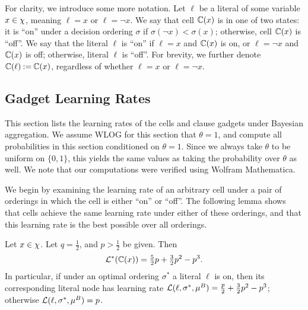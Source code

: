 For clarity, we introduce some more notation. Let $ \ell $ be a literal of some variable $ x \in \chi $, meaning $ \ell = x $ or $ \ell = \lnot x $.
We say that cell $\mathbb{C}\!\left(x\right)$ is in one of two states: it is ``on'' under a decision ordering $\sigma$ if $\sigma(\lnot x) < \sigma(x)$; otherwise, cell $\mathbb{C}\!\left(x\right)$ is ``off''.
We say that the literal $ \ell $ is ``on'' if $ \ell = x $ and $ \mathbb{C}\!\left(x\right) $ is on, or $ \ell = \lnot x $ and $ \mathbb{C}\!\left(x\right) $ is off; otherwise, literal $ \ell $ is ``off''.
For brevity, we further denote $ \mathbb{C}\!\left(\ell\right) \mathbin{:=} \mathbb{C}\!\left(x\right) $, regardless of whether $ \ell = x $ or $ \ell = \lnot x $.

\subsection{Gadget Learning Rates}
This section lists the learning rates of the cells and clause gadgets under Bayesian aggregation. We assume WLOG for this section that $\theta = 1$, and compute all probabilities in this section conditioned on $\theta = 1$. Since we always take $\theta$ to be uniform on $\{0,1\}$, this yields the same values as taking the probability over $\theta$ as well. We note that our computations were verified using Wolfram Mathematica.

We begin by examining the learning rate of an arbitrary cell under a pair of orderings in which the cell is either ``on'' or ``off''. The following lemma shows that cells achieve the same learning rate under either of these orderings, and that this learning rate is the best possible over all orderings. 

\begin{lemma} \label{lemma:bayesian_cellLearningRate}
    Let $x \in \chi$.
    Let $ q = \frac 12 $, and $ p > \frac 12 $ be given.
    Then \[
	\mathcal{L}^* (\mathbb{C}\!\left(x\right)) = \tfrac 52 p + \tfrac 32 p^2 - p^3.
    \]
    In particular, if under an optimal ordering $ \sigma^* $ a literal $ \ell $ is on, then its corresponding literal node has learning rate $ \mathcal{L} (\ell, \sigma^*, \mu^B) = \frac p2 + \frac 32 p^2 - p^3 $; otherwise $ \mathcal{L} (\ell, \sigma^*, \mu^B) = p $.
\end{lemma}

